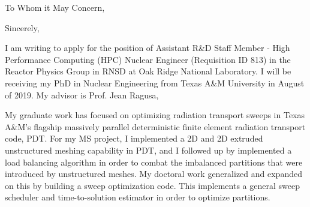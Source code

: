 \documentclass[11pt,letterpaper,roman]{moderncv}        %
\begin{document}
\date{\today}
\opening{To Whom it May Concern,}
\closing{Sincerely,}

\makelettertitle

I am writing to apply for the position of Assistant R\&D Staff Member - High Performance Computing (HPC) Nuclear Engineer (Requisition ID 813) in the Reactor Physics Group in RNSD at Oak Ridge National Laboratory. I will be receiving my PhD in Nuclear Engineering from Texas A\&M University in August of 2019. My advisor is Prof. Jean Ragusa, %

My graduate work has focused on optimizing radiation transport sweeps in Texas A\&M's flagship massively parallel deterministic finite element radiation transport code, PDT. For my MS project, I implemented a 2D and 2D extruded unstructured meshing capability in PDT, and I followed up by implemented a load balancing algorithm in order to combat the imbalanced partitions that were introduced by unstructured meshes. My doctoral work generalized and expanded on this by building a sweep optimization code. This implements a general sweep scheduler and time-to-solution estimator in order to optimize partitions. %


\end{document}
